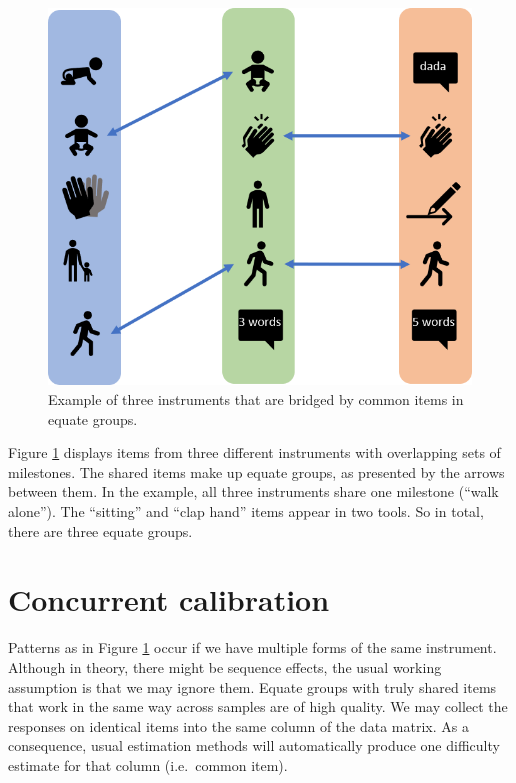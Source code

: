 \documentclass[
]{book}
\begin{document}
\begin{figure}

{\centering \includegraphics[width=0.75\linewidth]{fig/equate_ex} 

}

\caption{Example of three instruments that are bridged by common items in equate groups.}\label{fig:equateex}
\end{figure}



Figure \ref{fig:equateex} displays items from three different instruments with overlapping sets of milestones. The shared items make up equate groups, as presented by the arrows between them. In the example, all three instruments share one milestone (``walk alone''). The ``sitting'' and ``clap hand'' items appear in two tools. So in total, there are three equate groups.

\hypertarget{sec:concurrent}{%
\section{Concurrent calibration}\label{sec:concurrent}}

Patterns as in Figure \ref{fig:equateex} occur if we have multiple forms of the same instrument. Although in theory, there might be sequence effects, the usual working assumption is that we may ignore them. Equate groups with truly shared items that work in the same way across samples are of high quality. We may collect the responses on identical items into the same column of the data matrix. As a consequence, usual estimation methods will automatically produce one difficulty estimate for that column (i.e.~common item).
\end{document}
